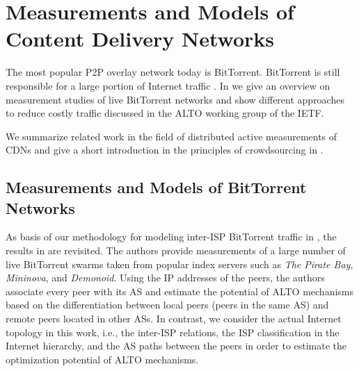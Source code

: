 \section{Measurements and Models of Content Delivery Networks}\label{sec:aslevel:measurements}

The most popular P2P overlay network today is BitTorrent.
BitTorrent is still responsible for a large portion of Internet traffic \cite{cisco2016,wamser2010}.
In  we give an overview on measurement studies of live BitTorrent networks and show different approaches to reduce costly traffic discussed in the ALTO working group of the IETF.

We summarize related work in the field of distributed active measurements of CDNs and give a short introduction in the principles of crowdsourcing in .

\subsection{Measurements and Models of BitTorrent Networks}\label{aslevel:measurements:bittorrent}

As basis of our methodology for modeling inter-ISP BitTorrent traffic in , the results in \cite{Hossfeld2011} are revisited. The authors provide measurements of a large number of live BitTorrent swarms taken from popular index servers such as \emph{The Pirate Bay}, \emph{Mininova}, and \emph{Demonoid}. Using the IP addresses of the peers, the authors associate every peer with its AS and estimate the potential of ALTO mechanisms based on the differentiation between local peers (peers in the same AS) and remote peers located in other ASs. In contrast, we consider the actual Internet topology in this work, i.e., the inter-ISP relations, the ISP classification in the Internet hierarchy, and the AS paths between the peers in order to estimate the optimization potential of ALTO mechanisms.


